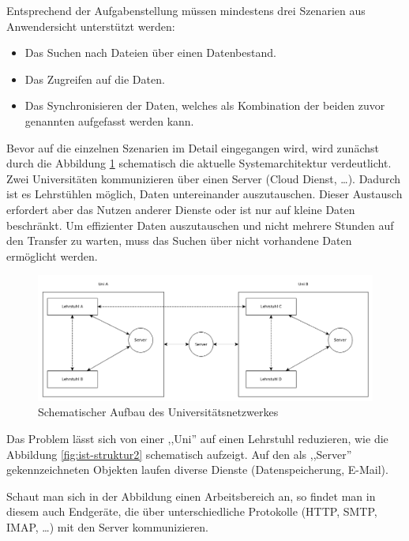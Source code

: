 \documentclass[oneside, ngerman, toc=bibliography,bibliography=totoc,listof=entryprefix, open=right,numbers=noenddot,fontsize=12pt]{scrbook}
\begin{document}
Entsprechend der Aufgabenstellung müssen mindestens drei Szenarien aus Anwendersicht unterstützt werden:
\begin{itemize}
	\item Das Suchen nach Dateien über einen Datenbestand.
	\item Das Zugreifen auf die Daten.
	\item Das Synchronisieren der Daten, welches als Kombination der beiden zuvor genannten aufgefasst werden kann.
\end{itemize}

Bevor auf die einzelnen Szenarien im Detail eingegangen wird, wird zunächst durch die Abbildung \ref{fig:ist-struktur} schematisch die aktuelle Systemarchitektur verdeutlicht. Zwei Universitäten kommunizieren über einen Server (Cloud Dienst, \ldots). Dadurch ist es Lehrstühlen möglich, Daten untereinander auszutauschen. Dieser Austausch erfordert aber das Nutzen anderer Dienste oder ist nur auf kleine Daten beschränkt. Um effizienter Daten auszutauschen und nicht mehrere Stunden auf den Transfer zu warten, muss das Suchen über nicht vorhandene Daten ermöglicht werden.

\begin{figure}[htbp] 
    \centering
    \includegraphics[width=\textwidth]{Masterarbeit_Bilder/Lehrstuhl_Datentausch_extern.png}
    \caption{Schematischer Aufbau des Universitätsnetzwerkes}
    \label{fig:ist-struktur}
\end{figure}    

Das Problem  lässt sich von einer ,,Uni'' auf einen Lehrstuhl reduzieren, wie  die Abbildung \ref{fig:ist-struktur2} schematisch aufzeigt.
Auf den als ,,Server'' gekennzeichneten Objekten laufen diverse Dienste (Datenspeicherung, E-Mail).

Schaut man sich in der Abbildung einen Arbeitsbereich an, so findet man in diesem auch Endgeräte, die über unterschiedliche Protokolle (HTTP, SMTP, IMAP, \ldots) mit den Server kommunizieren.
\end{document}
